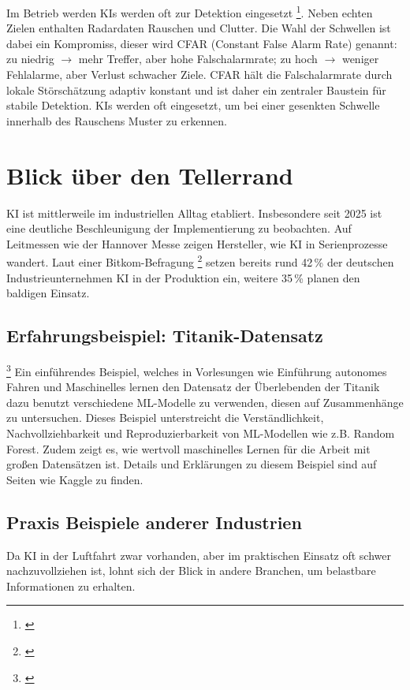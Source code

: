 Im Betrieb werden KIs werden oft zur Detektion eingesetzt \label{sec:cfar}  \footnote{ \parencite{Coluccia2020Sensors4172}}.
Neben echten Zielen enthalten Radardaten Rauschen und Clutter.
Die Wahl der Schwellen ist dabei 
ein Kompromiss, dieser wird CFAR (Constant False Alarm Rate) genannt: 
zu niedrig $\rightarrow$ mehr Treffer, aber hohe Falschalarmrate; zu hoch $\rightarrow$
weniger Fehlalarme, aber Verlust schwacher Ziele. CFAR hält die
Falschalarmrate durch lokale Störschätzung adaptiv konstant und ist daher ein zentraler Baustein für
stabile Detektion.
KIs werden oft eingesetzt, um bei einer gesenkten Schwelle innerhalb des Rauschens 
Muster zu erkennen.


\section{Blick über den Tellerrand}\label{sec:praxis}
KI ist mittlerweile im industriellen Alltag etabliert. Insbesondere seit 2025 ist eine deutliche 
Beschleunigung der Implementierung zu beobachten. Auf Leitmessen wie der Hannover Messe zeigen Hersteller, wie KI in Serienprozesse wandert.
Laut einer Bitkom-Befragung  \footnote{ \parencite{handelsblatt-hannovermesse-2025}} 
setzen bereits rund 42\,\% der deutschen Industrieunternehmen KI in der Produktion ein,
weitere 35\,\% planen den baldigen Einsatz.

\subsection{Erfahrungsbeispiel: Titanik-Datensatz} \footnote{ \parencite{KaggleTitanic}}
Ein einführendes Beispiel, welches in Vorlesungen wie Einführung autonomes Fahren und Maschinelles lernen 
den Datensatz der Überlebenden der Titanik dazu benutzt verschiedene ML-Modelle zu verwenden, diesen auf 
Zusammenhänge zu untersuchen.
Dieses Beispiel unterstreicht die Verständlichkeit, Nachvollziehbarkeit und Reproduzierbarkeit von ML-Modellen wie 
z.B. Random Forest. Zudem zeigt es, wie wertvoll maschinelles Lernen für die Arbeit mit großen Datensätzen ist. 
Details und Erklärungen zu diesem Beispiel sind auf Seiten wie Kaggle zu finden. 

\subsection{Praxis Beispiele anderer Industrien}
Da KI in der Luftfahrt zwar vorhanden, aber im praktischen Einsatz oft schwer nachzuvollziehen ist, 
lohnt sich der Blick in andere Branchen, um belastbare Informationen zu erhalten.

